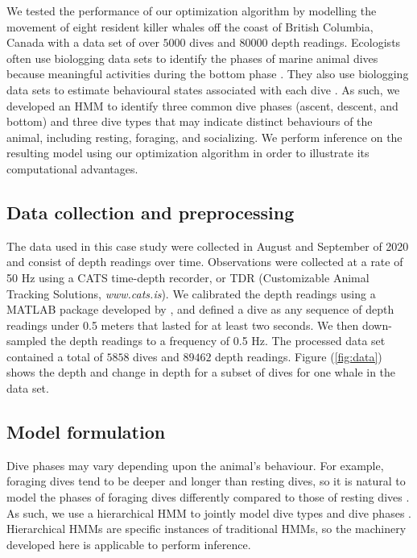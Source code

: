 We tested the performance of our optimization algorithm by modelling the movement of eight resident killer whales off the coast of British Columbia, Canada with a data set of over $5000$ dives and $80000$ depth readings. Ecologists often use biologging data sets to identify the phases of marine animal dives because meaningful activities during the bottom phase \citep[e.g., searching and hunting for prey,][]{Wright:2017,Jensen:2023}. They also use biologging data sets to estimate behavioural states associated with each dive \citep[e.g. foraging, resting, and travelling,][]{Tennessen:2019b}. As such, we developed an HMM to identify three common dive phases (ascent, descent, and bottom) and three dive types that may indicate distinct behaviours of the animal, including resting, foraging, and socializing. We perform inference on the resulting model using our optimization algorithm in order to illustrate its computational advantages.

\subsection{Data collection and preprocessing}

The data used in this case study were collected in August and September of 2020 and consist of depth readings over time. Observations were collected at a rate of 50 Hz using a CATS time-depth recorder, or TDR (Customizable Animal Tracking Solutions, {\em{www.cats.is}}). We calibrated the depth readings using a MATLAB package developed by \citet{Cade:2021}, and defined a dive as any sequence of depth readings under 0.5 meters that lasted for at least two seconds. We then down-sampled the depth readings to a frequency of 0.5 Hz. The processed data set contained a total of $5858$ dives and $89462$ depth readings. Figure (\ref{fig:data}) shows the depth and change in depth for a subset of dives for one whale in the data set. 

\subsection{Model formulation}

Dive phases may vary depending upon the animal's behaviour. For example, foraging dives tend to be deeper and longer than resting dives, so it is natural to model the phases of foraging dives differently compared to those of resting dives \citep{Tennessen:2019b}. As such, we use a hierarchical HMM to jointly model dive types and dive phases \citep{Barajas:2017}. Hierarchical HMMs are specific instances of traditional HMMs, so the machinery developed here is applicable to perform inference. 

